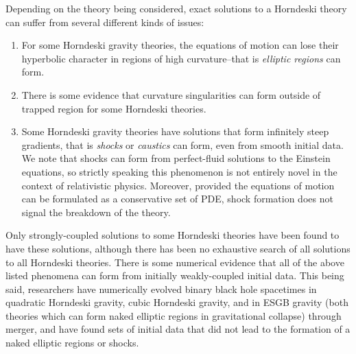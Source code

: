 \documentclass{ws-ijmpd}
\begin{document}
Depending on the theory being considered,
exact solutions to a Horndeski theory can suffer
from several different kinds of issues:
\begin{enumerate}
   \item For some Horndeski gravity theories,
      the equations of motion can lose their hyperbolic character
      in regions of high curvature--that is
      \emph{elliptic regions}\cite{Ripley:2019hxt,
         Ripley:2019irj,Figueras:2020dzx} can form.
   
      \item There is some evidence that
      curvature singularities can form outside of trapped region for
      some Horndeski theories\cite{Kanti:1995vq,Sotiriou:2014pfa,
      Silva:2017uqg,Doneva:2017bvd,Antoniou:2017hxj,Kleihaus:2015aje}.
   
   \item Some Horndeski gravity theories have solutions that
      form infinitely steep gradients, that is
      \emph{shocks} or 
      \emph{caustics}\cite{Babichev:2016hys,
         deRham:2016ged, 
         Tanahashi:2017kgn,
         Pasmatsiou:2017vcw,
         Babichev:2017lrx,
         Lara:2021piy
      } can form, even from smooth initial data. 
      We note that shocks can form from perfect-fluid solutions
      to the Einstein equations, so strictly speaking this phenomenon
      is not entirely novel in the context of relativistic physics.
      Moreover, provided the equations of motion can be formulated
      as a conservative set of PDE, shock formation does not signal
      the breakdown of the theory.

\end{enumerate}
Only strongly-coupled solutions to some Horndeski theories
have been found to have these solutions,
although there has been no exhaustive search of all solutions
to all Horndeski theories.
There is some numerical evidence that all of the above listed
phenomena can form from initially weakly-coupled initial data.
This being said,
researchers have numerically evolved binary black hole spacetimes
in quadratic Horndeski gravity, cubic Horndeski gravity,
and in ESGB gravity (both theories
which can form naked elliptic regions in 
gravitational collapse\cite{Ripley:2019hxt,
Ripley:2019irj,Bernard:2019fjb,Figueras:2020dzx,Lara:2021piy}) 
through merger, and have found sets of initial data that did not lead to
the formation of a naked elliptic regions or 
shocks\cite{East:2020hgw,East:2021bqk,Figueras:2021abd}.
\end{document}
